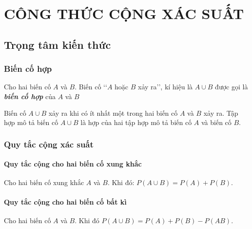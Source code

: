 \setcounter{section}{1}
\section{CÔNG THỨC CỘNG XÁC SUẤT}
\subsection{Trọng tâm kiến thức}
\begin{tomtat}
\subsubsection{Biến cố hợp}
\begin{boxdn}
	{Cho hai biến cố $A$ và $B$. Biến cố \lq\lq$A$ hoặc $B$ xảy ra\rq\rq, kí hiệu là $A\cup B$ được gọi là \textbf{\textit{biến cố hợp}} của $A$ và $B$}
\end{boxdn}
\begin{note}
	{Biến cố $A \cup B$ xảy ra khi có ít nhất một trong hai biến cố $A$ và $B$ xảy ra. Tập hợp mô tả biến cố $A \cup B$ là hợp của hai tập hợp mô tả biến cố $A$ và biến cố $B$.}
\end{note}
\subsubsection{Quy tắc cộng xác suất}
\paragraph{Quy tắc cộng cho hai biến cố xung khắc}
\begin{boxdn}
	{Cho hai biến cố xung khắc $A$ và $B$. Khi đó: $P(A \cup B)=P(A)+P(B)$.}
\end{boxdn}
\paragraph{Quy tắc cộng cho hai biến cố bất kì}
\begin{boxdn}
	{Cho hai biến cố $A$ và $B$. Khi đó $P(A \cup B)=P(A)+P(B)-P(A B)$.}
\end{boxdn}        
\end{tomtat}

